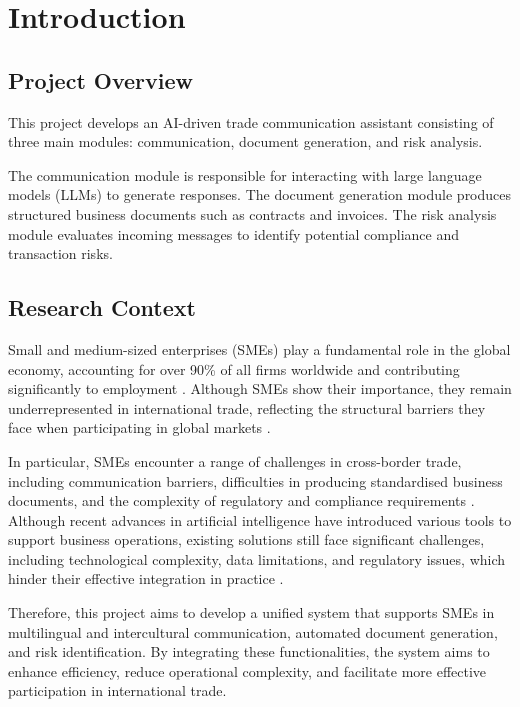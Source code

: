 \documentclass[12pt,a4paper]{report}
\begin{document}
\tableofcontents

%

\chapter{Introduction}

\section{Project Overview}

This project develops an AI-driven trade communication assistant consisting of three main modules: communication, document generation, and risk analysis.

The communication module is responsible for interacting with large language models (LLMs) to generate responses. The document generation module produces structured business documents such as contracts and invoices. The risk analysis module evaluates incoming messages to identify potential compliance and transaction risks.

\section{Research Context}

Small and medium-sized enterprises (SMEs) play a fundamental role in the global economy, accounting for over 90\% of all firms worldwide and contributing significantly to employment \citep{wto2016, worldbank2020}. Although SMEs show their importance, they remain underrepresented in international trade, reflecting the structural barriers they face when participating in global markets \citep{wto2016,oecd2017}.

In particular, SMEs encounter a range of challenges in cross-border trade, including communication barriers, difficulties in producing standardised business documents, and the complexity of regulatory and compliance requirements \citep{oecd2017, unctad2021}. Although recent advances in artificial intelligence have introduced various tools to support business operations, existing solutions still face significant challenges, including technological complexity, data limitations, and regulatory issues, which hinder their effective integration in practice \citep{ozturk2024}.

Therefore, this project aims to develop a unified system that supports SMEs in multilingual and intercultural communication, automated document generation, and risk identification. By integrating these functionalities, the system aims to enhance efficiency, reduce operational complexity, and facilitate more effective participation in international trade.
\end{document}

